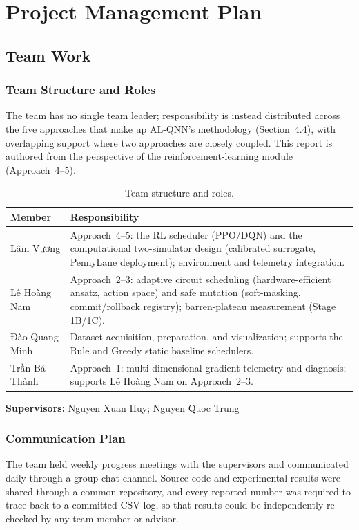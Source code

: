 \section{Project Management Plan}
\subsection{Team Work}
\subsubsection{Team Structure and Roles}
The team has no single team leader; responsibility is instead distributed across the five approaches that make up AL-QNN's methodology (Section~4.4), with overlapping support where two approaches are closely coupled. This report is authored from the perspective of the reinforcement-learning module (Approach~4--5).

\begin{table}[htbp]
\centering
\caption{Team structure and roles.}
\label{tab:team}
\begin{tabular}{|p{3.2cm}|p{10cm}|}
\hline
\textbf{Member} & \textbf{Responsibility} \\
\hline
Lâm Vương & Approach~4--5: the RL scheduler (PPO/DQN) and the computational two-simulator design (calibrated surrogate, PennyLane deployment); environment and telemetry integration. \\
Lê Hoàng Nam & Approach~2--3: adaptive circuit scheduling (hardware-efficient ansatz, action space) and safe mutation (soft-masking, commit/rollback registry); barren-plateau measurement (Stage 1B/1C). \\
Đào Quang Minh & Dataset acquisition, preparation, and visualization; supports the Rule and Greedy static baseline schedulers. \\
Trần Bá Thành & Approach~1: multi-dimensional gradient telemetry and diagnosis; supports Lê Hoàng Nam on Approach~2--3. \\
\hline
\end{tabular}
\end{table}

\quad \textbf{Supervisors:} Nguyen Xuan Huy; Nguyen Quoc Trung

\subsubsection{Communication Plan}
The team held weekly progress meetings with the supervisors and communicated daily through a group chat channel. Source code and experimental results were shared through a common repository, and every reported number was required to trace back to a committed CSV log, so that results could be independently re-checked by any team member or advisor.

